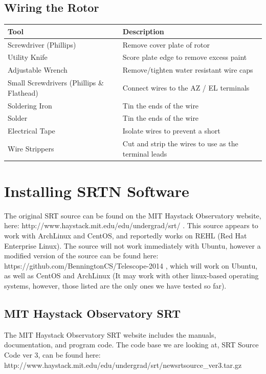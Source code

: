 \documentclass[11pt]{article} %
\begin{document}
\subsection{Wiring the Rotor}
\begin{tabular}{| l | l |}
\hline
\textbf{Tool} & \textbf{Description} \\ \hline \hline
Screwdriver (Phillips) & Remove cover plate of rotor \\ \hline
Utility Knife & Score plate edge to remove excess paint \\ \hline
Adjustable Wrench & Remove/tighten water resistant wire caps \\ \hline
Small Screwdrivers (Phillips \& Flathead) & Connect wires to the AZ / EL terminals \\ \hline
Soldering Iron & Tin the ends of the wire \\ \hline
Solder & Tin the ends of the wire \\ \hline
Electrical Tape & Isolate wires to prevent a short \\ \hline
Wire Strippers & Cut and strip the wires to use as the terminal leads \\ \hline
\end{tabular}



\newpage
\section{Installing SRTN Software}

The original SRT source can be found on the MIT Haystack Observatory website, here: http://www.haystack.mit.edu/edu/undergrad/srt/ . This source appears to work with ArchLinux and CentOS, and reportedly works on REHL (Red Hat Enterprise Linux). The source will not work immediately with Ubuntu, however a modified version of the source can be found here: https://github.com/BenningtonCS/Telescope-2014 , which will work on Ubuntu, as well as CentOS and ArchLinux (It may work with other linux-based operating systems, however, those listed are the only ones we have tested so far). 

\subsection{MIT Haystack Observatory SRT}
The MIT Haystack Observatory SRT website includes the manuals, documentation, and program code. The code base we are looking at, SRT Source Code ver 3, can be found here: \\ http://www.haystack.mit.edu/edu/undergrad/srt/newsrtsource\_ver3.tar.gz
\end{document}
